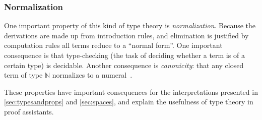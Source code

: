 \subsubsection{Normalization}
One important property of this kind of type theory is
\emph{normalization}. Because the derivations are made up from introduction
rules, and elimination is justified by computation rules all terms reduce to a
``normal form''. One important consequence is that type-checking (the task of
deciding whether a term is of a certain type) is decidable. Another consequence
is \emph{canonicity}: that any closed term of type $\mathbb{N}$ normalizes to a
numeral~\cite{hottbook}.

These properties have important consequences for the interpretations presented
in \autoref{sec:typesandprops} and \autoref{sec:spaces}, and explain the
usefulness of type theory in proof assistants.